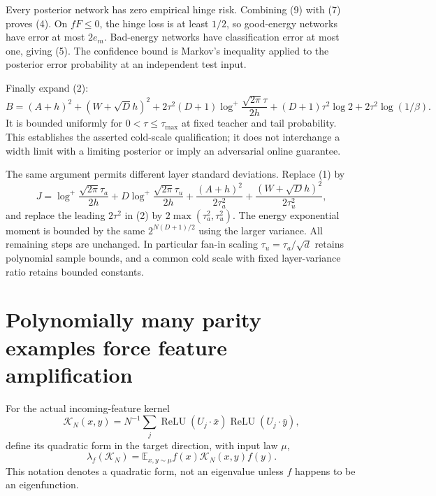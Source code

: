 \documentclass[11pt]{article}
\newcommand{\E}{\mathbb E}\newcommand{\R}{\mathbb R}
\newcommand{\relu}{\operatorname{ReLU}}\newcommand{\Prb}{\mathbb P}
\begin{document}
Every posterior network has zero empirical hinge risk. Combining (9)
with (7) proves (4). On $fF\le0$, the hinge loss is at least $1/2$,
so good-energy networks have error at most $2e_m$. Bad-energy networks
have classification error at most one, giving (5). The confidence bound
is Markov's inequality applied to the posterior error probability at
an independent test input.

Finally expand (2):
\[
 B=(A+h)^2+(W+\sqrt D h)^2+
 2\tau^2(D+1)\log^+\frac{\sqrt{2\pi}\tau}{2h}
 +(D+1)\tau^2\log2+2\tau^2\log(1/\beta).
\]
It is bounded uniformly for $0<\tau\le\tau_{\max}$ at fixed teacher
and tail probability. This establishes the asserted cold-scale
qualification; it does not interchange a width limit with a limiting
posterior or imply an adversarial online guarantee.

The same argument permits different layer standard deviations. Replace
(1) by
\[
 J=\log^+\frac{\sqrt{2\pi}\tau_a}{2h}
   +D\log^+\frac{\sqrt{2\pi}\tau_u}{2h}
   +\frac{(A+h)^2}{2\tau_a^2}
   +\frac{(W+\sqrt D h)^2}{2\tau_u^2},
\]
and replace the leading $2\tau^2$ in (2) by
$2\max(\tau_a^2,\tau_u^2)$. The energy exponential moment is bounded
by the same $2^{N(D+1)/2}$ using the larger variance. All remaining
steps are unchanged. In particular fan-in scaling $\tau_u=\tau_a/\sqrt d$
retains polynomial sample bounds, and a common cold scale with fixed
layer-variance ratio retains bounded constants.

\section{Polynomially many parity examples force feature amplification}
For the actual incoming-feature kernel
\[
 \mathcal K_N(x,y)=N^{-1}\sum_j
           \relu(U_j\cdot\bar x)\relu(U_j\cdot\bar y),
\]
define its quadratic form in the target direction, with input law $\mu$,
\[
 \lambda_f(\mathcal K_N)=\E_{x,y\sim\mu}
                                  f(x)\mathcal K_N(x,y)f(y).
\]
This notation denotes a quadratic form, not an eigenvalue unless $f$
happens to be an eigenfunction.
\end{document}
